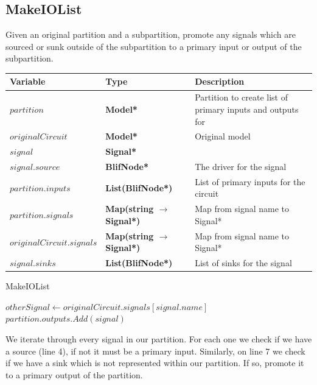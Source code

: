 \documentclass[12pt,final,oneside]{article} %
\begin{document}
\subsection{MakeIOList}
Given an original partition and a subpartition, promote any signals which are sourced or sunk outside of the subpartition to a primary input or output of the subpartition.
\begin{algorithm}
   \begin{center}
        \begin{tabularx}{\linewidth}{llX}
        \toprule
        Variable & Type & Description\\
        \midrule
        $partition$ &\bf  Model* & Partition to create list of primary inputs and outputs for\\
        $originalCircuit$ &\bf  Model* & Original model \\
        $signal$ &\bf  Signal* & \\
        $signal.source$ &\bf  BlifNode* & The driver for the signal \\
        $partition.inputs$ &\bf  List(BlifNode*) & List of primary inputs for the circuit \\
        $partition.signals$ &\bf  Map(string $\to$ Signal*) & Map from signal name to Signal* \\
        $originalCircuit.signals$ &\bf  Map(string $\to$ Signal*) & Map from signal name to Signal* \\
        $signal.sinks$ &\bf  List(BlifNode*) & List of sinks for the signal \\

        \bottomrule
        \end{tabularx}
    \end{center}
   \caption{MakeIOList}\label{makeiolist}
   \begin{algorithmic}[1]
                
               \EndIf
               \State $otherSignal \gets originalCircuit.signals[signal.name]$ 
                
                  \State $partition.outputs.Add(signal)$
               \EndIf
            \EndFor
         \EndProcedure
   \end{algorithmic}
\end{algorithm}
We iterate through every signal in our partition. For each one we check if we have a source (line 4), if not it must be a primary input. Similarly, on line 7 we check if we have a sink which is not represented within our partition. If so, promote it to a primary output of the partition.
\end{document}
